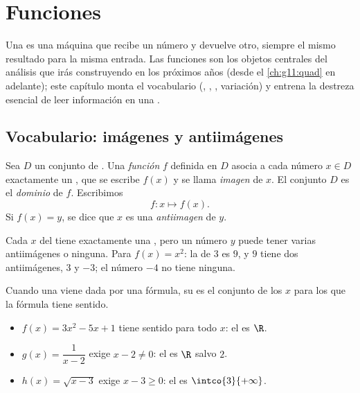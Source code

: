 \chapter{Funciones}\label{ch:g10:functions}

Una  es una máquina que recibe un número y devuelve otro, siempre el
mismo resultado para la misma entrada. Las funciones son los objetos
centrales del análisis que irás construyendo en los próximos años (desde
el \cref{ch:g11:quad} en adelante); este capítulo monta el vocabulario
(, , , variación) y entrena la destreza esencial de
leer información en una .

\section{Vocabulario: imágenes y antiimágenes}

\begin{definition}[Función]\label{def:g10:functions:function}
Sea $D$ un conjunto de . Una \emph{función}
$f$ definida en $D$ asocia a cada número $x \in D$ exactamente un , que se escribe $f(x)$ y se llama \emph{imagen} de $x$.
El conjunto $D$ es el \emph{dominio} de $f$. Escribimos
\[
f : x \longmapsto f(x).
\]
Si $f(x) = y$, se dice que $x$ es una
\emph{antiimagen} de $y$.
\end{definition}

\begin{remark}
Cada $x$ del  tiene exactamente una , pero un número $y$
puede tener varias antiimágenes o ninguna. Para $f(x) = x^2$: la  de
$3$ es $9$, y $9$ tiene dos antiimágenes, $3$ y $-3$; el número $-4$ no
tiene ninguna.
\end{remark}

\begin{example}\label{ex:g10:functions:domain}
Cuando una  viene dada por una fórmula, su  es el conjunto
de los $x$ para los que la fórmula tiene sentido.
\begin{itemize}
  \item $f(x) = 3x^2 - 5x + 1$ tiene sentido para todo $x$: el  es
        $\R$.
  \item $g(x) = \dfrac{1}{x - 2}$ exige $x - 2 \neq 0$: el  es
        $\R$ salvo $2$.
  \item $h(x) = \sqrt{x - 3}$ exige $x - 3 \geq 0$: el  es
        $\intco{3}{+\infty}$.
\end{itemize}
\end{example}


